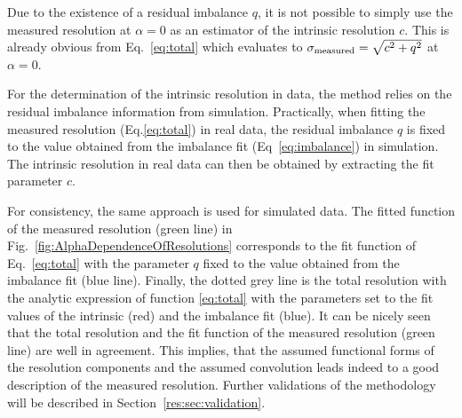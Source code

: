 Due to the existence of a residual imbalance $q$, it is not possible to simply use the measured resolution at $\alpha=0$ as an estimator of the intrinsic resolution $c$.
This is already obvious from Eq.~\eqref{eq:total} which evaluates to $\sigma_\mathrm{measured}  = \sqrt{c^2 + q^2}$ at $\alpha=0$.

For the determination of the intrinsic resolution in data, the method relies on the residual imbalance information from simulation.
Practically, when fitting the measured resolution (Eq.\eqref{eq:total}) in real data, the residual imbalance $q$ is fixed to the value obtained from the imbalance fit (Eq~\ref{eq:imbalance}) in simulation.
The intrinsic resolution in real data can then be obtained by extracting the fit parameter $c$.

For consistency, the same approach is used for simulated data.
The fitted function of the measured resolution (green line) in Fig.~\ref{fig:AlphaDependenceOfResolutions} corresponds to the fit function of Eq.~\eqref{eq:total} with the parameter $q$ fixed to the value obtained from the imbalance fit (blue line).
Finally, the dotted grey line is the total resolution with the analytic expression of function \eqref{eq:total} with the parameters set to the fit values of the intrinsic (red) and the imbalance fit (blue). 
It can be nicely seen that the total resolution and the fit function of the measured resolution (green line) are well in agreement.
This implies, that the assumed functional forms of the resolution components and the assumed convolution leads indeed to a good description of the measured resolution.
Further validations of the methodology will be described in Section~\ref{res:sec:validation}.


